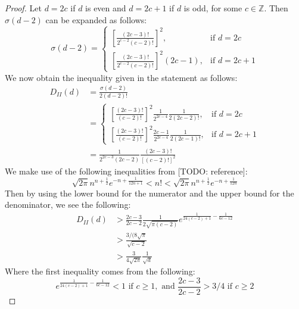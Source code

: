 \documentclass[11pt]{article}
\theoremstyle{plain}
\theoremstyle{definition}
\theoremstyle{remark}
\numberwithin{equation}{section}
\newcommand{\ZZ}{\mathbb{Z}}
\begin{document}
\begin{proof}
  Let $d=2c$ if $d$ is even and $d=2c+1$ if $d$ is odd, for some $c \in \ZZ$. Then $\sigma(d-2)$
  can be expanded as follows:
  \begin{equation*}
    \sigma(d-2)=\begin{cases}
      \left[\frac{(2c-3)!}{2^{c-2}(c-2)!}\right]^2,&\text{if }d=2c\\
      \left[\frac{(2c-3)!}{2^{c-2}(c-2)!}\right]^2(2c-1),&\text{if }d=2c+1
    \end{cases}
  \end{equation*}
  We now obtain the inequality given in the statement as follows:
  \begin{align*}
    D_{II}(d)&=\frac{\sigma(d-2)}{2(d-2)!}\\
             &=\begin{cases}
                  \left[\frac{(2c-3)!}{(c-2)!}\right]^2\frac{1}{2^{2c-4}}\frac{1}{2(2c-2)!},&\text{if }d=2c\\
                  \left[\frac{(2c-3)!}{(c-2)!}\right]^2\frac{2c-1}{2^{2c-4}}\frac{1}{2(2c-1)!},&\text{if }d=2c+1
                 \end{cases}\\
             &=\frac{1}{2^{2c-3}(2c-2)}\frac{(2c-3)!}{[(c-2)!]^2}
  \end{align*}
  We make use of the following inequalities from [TODO: reference]:
  \begin{equation*}
    \sqrt{2\pi}n^{n+\frac{1}{2}}e^{-n+\frac{1}{12n+1}}<n!<\sqrt{2\pi}n^{n+\frac{1}{2}}e^{-n+\frac{1}{12n}}
  \end{equation*}
  Then by using the lower bound for the numerator and the upper bound for the denominator,
  we see the following:
  \begin{align*}
    D_{II}(d)&>\frac{2c-3}{2c-2}\frac{1}{2\sqrt{\pi(c-2)}}e^{\frac{1}{24(c-2)+1}-\frac{1}{6c-12}}\\
             &>\frac{3/(8\sqrt{\pi}}{\sqrt{c-2}}\\
             &>\frac{3}{4\sqrt{2\pi}}\frac{1}{\sqrt{d}}
  \end{align*}
  Where the first inequality comes from the following:
  \begin{equation*}
    e^{\frac{1}{24(c-2)+1}-\frac{1}{6c-12}}<1\text{ if }c\geq1,\text{ and }\frac{2c-3}{2c-2}>3/4\text{ if }c\geq2
  \end{equation*}
\end{proof}
\end{document}
